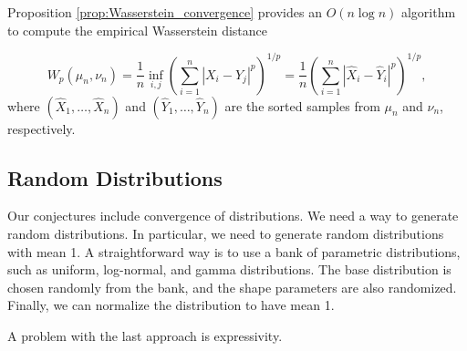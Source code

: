 Proposition \ref{prop:Wasserstein_convergence} provides an $O(n\log n)$ algorithm to compute the empirical Wasserstein distance

\begin{equation}
  W_p(\mu_n, \nu_n) =  \frac{1}{n} \inf_{i,j} \left( \sum_{i=1}^n |X_i - Y_j|^p \right)^{1/p} = \frac{1}{n} \left(  \sum_{i=1}^n |\hat{X}_{i} - \hat{Y}_{i}|^p \right)^{1/p},
\end{equation}
where $(\hat{X}_1, \ldots, \hat{X}_n)$ and $(\hat{Y}_1, \ldots, \hat{Y}_n)$ are the sorted samples from $\mu_n$ and $\nu_n$, respectively.

\subsection{Random Distributions}
Our conjectures include convergence of distributions. We need a way to generate random distributions. In particular, we need to generate random distributions with mean 1. A straightforward way is to use a bank of parametric distributions, such as uniform, log-normal, and gamma distributions. The base distribution is chosen randomly from the bank, and the shape parameters are also randomized. Finally, we can normalize the distribution to have mean 1.

A problem with the last approach is expressivity.